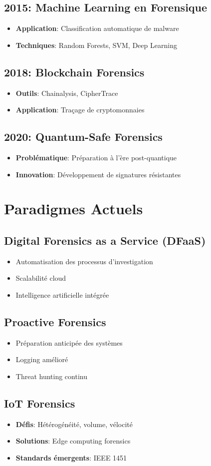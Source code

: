 \subsection{2015: Machine Learning en Forensique}
\begin{itemize}
\item \textbf{Application}: Classification automatique de malware
\item \textbf{Techniques}: Random Forests, SVM, Deep Learning
\end{itemize}

\subsection{2018: Blockchain Forensics}
\begin{itemize}
\item \textbf{Outils}: Chainalysis, CipherTrace
\item \textbf{Application}: Traçage de cryptomonnaies
\end{itemize}

\subsection{2020: Quantum-Safe Forensics}
\begin{itemize}
\item \textbf{Problématique}: Préparation à l'ère post-quantique
\item \textbf{Innovation}: Développement de signatures résistantes
\end{itemize}

\section{Paradigmes Actuels}
\subsection{Digital Forensics as a Service (DFaaS)}
\begin{itemize}
\item Automatisation des processus d'investigation
\item Scalabilité cloud
\item Intelligence artificielle intégrée
\end{itemize}

\subsection{Proactive Forensics}
\begin{itemize}
\item Préparation anticipée des systèmes
\item Logging amélioré
\item Threat hunting continu
\end{itemize}

\subsection{IoT Forensics}
\begin{itemize}
\item \textbf{Défis}: Hétérogénéité, volume, vélocité
\item \textbf{Solutions}: Edge computing forensics
\item \textbf{Standards émergents}: IEEE 1451
\end{itemize}